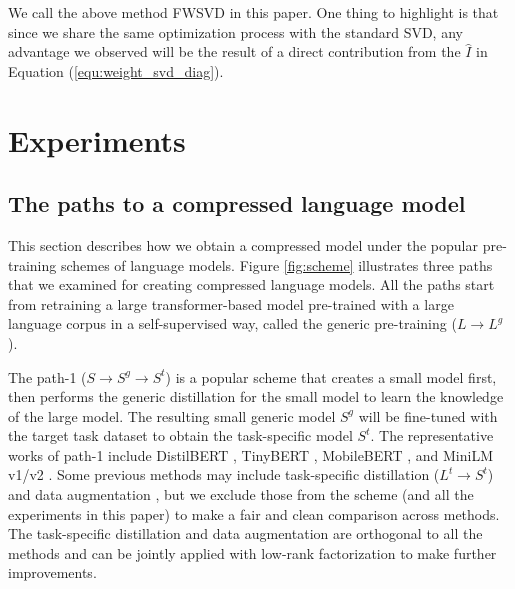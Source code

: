 \documentclass{article} %
\begin{document}
We call the above method FWSVD in this paper. One thing to highlight is that since we share the same optimization process with the standard SVD, any advantage we observed will be the result of a direct contribution from the $\hat I$ in Equation (\ref{equ:weight_svd_diag}). 



\section{Experiments}



\subsection{The paths to a compressed language model}\label{sec:3path}


This section describes how we obtain a compressed model under the popular pre-training schemes of language models. Figure \ref{fig:scheme} illustrates three paths that we examined for creating compressed language models. All the paths start from retraining a large transformer-based model pre-trained with a large language corpus in a self-supervised way, called the generic pre-training ($L \rightarrow L^g$). 

The path-1 ($S \rightarrow S^g \rightarrow S^t$) is a popular scheme that creates a small model first, then performs the generic distillation for the small model to learn the knowledge of the large model. The resulting small generic model $S^g$ will be fine-tuned with the target task dataset to obtain the task-specific model $S^t$. The representative works of path-1 include DistilBERT \citep{sanh2019distilbert}, TinyBERT \citep{jiao2019tinybert}, MobileBERT \citep{sun2020mobilebert}, and MiniLM v1/v2 \citep{wang2020minilm,wang2020minilmv2}. Some previous methods may include task-specific distillation ($L^t \rightarrow S^t$) and data augmentation \citep{jiao2019tinybert}, but we exclude those from the scheme (and all the experiments in this paper) to make a fair and clean comparison across methods. The task-specific distillation and data augmentation are orthogonal to all the methods and can be jointly applied with low-rank factorization to make further improvements.
\end{document}

